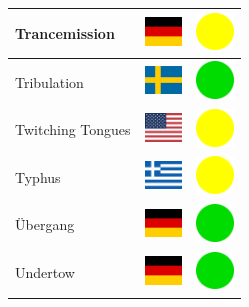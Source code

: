 \documentclass[12pt, a4paper, twoside]{report}
\begin{document}
\begin{center}
\begin{longtable}{|p{5cm}|p{2cm}|p{2cm}|}
Trancemission & \includegraphics[width=1cm]{4x3/de} & \includegraphics[width=1cm]{likes/m} \\ \hline
Tribulation & \includegraphics[width=1cm]{4x3/se} & \includegraphics[width=1cm]{likes/y} \\ \hline
Twitching Tongues & \includegraphics[width=1cm]{4x3/us} & \includegraphics[width=1cm]{likes/m} \\ \hline
Typhus & \includegraphics[width=1cm]{4x3/gr} & \includegraphics[width=1cm]{likes/m} \\ \hline
Übergang & \includegraphics[width=1cm]{4x3/de} & \includegraphics[width=1cm]{likes/y} \\ \hline
Undertow & \includegraphics[width=1cm]{4x3/de} & \includegraphics[width=1cm]{likes/y} \\ \hline

\end{longtable}
\end{center}
\end{document}
